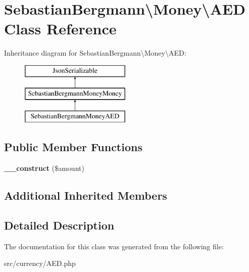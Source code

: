 \hypertarget{classSebastianBergmann_1_1Money_1_1AED}{}\section{Sebastian\+Bergmann\textbackslash{}Money\textbackslash{}A\+E\+D Class Reference}
\label{classSebastianBergmann_1_1Money_1_1AED}
Inheritance diagram for Sebastian\+Bergmann\textbackslash{}Money\textbackslash{}A\+E\+D\+:\begin{figure}[H]
\begin{center}
\leavevmode
\includegraphics[height=3.000000cm]{classSebastianBergmann_1_1Money_1_1AED}
\end{center}
\end{figure}
\subsection*{Public Member Functions}
\begin{DoxyCompactItemize}
\item 
\hypertarget{classSebastianBergmann_1_1Money_1_1AED_a29a1a25ea192e330e0d37367b4f2bf1c}{}{\bfseries \+\_\+\+\_\+construct} (\$amount)\label{classSebastianBergmann_1_1Money_1_1AED_a29a1a25ea192e330e0d37367b4f2bf1c}

\end{DoxyCompactItemize}
\subsection*{Additional Inherited Members}


\subsection{Detailed Description}


The documentation for this class was generated from the following file\+:\begin{DoxyCompactItemize}
\item 
src/currency/A\+E\+D.\+php\end{DoxyCompactItemize}
